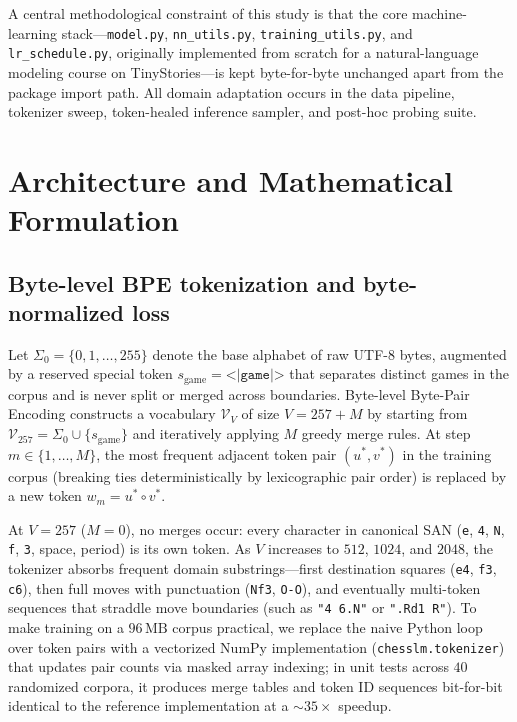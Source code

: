 \documentclass[11pt]{article}
\begin{document}
A central methodological constraint of this study is that the core machine-learning stack---\texttt{model.py}, \texttt{nn\_utils.py}, \texttt{training\_utils.py}, and \texttt{lr\_schedule.py}, originally implemented from scratch for a natural-language modeling course on TinyStories---is kept byte-for-byte unchanged apart from the package import path. All domain adaptation occurs in the data pipeline, tokenizer sweep, token-healed inference sampler, and post-hoc probing suite.

\section{Architecture and Mathematical Formulation}
\label{sec:architecture}

\subsection{Byte-level BPE tokenization and byte-normalized loss}
\label{sec:bpe}

Let $\Sigma_0 = \{0, 1, \dots, 255\}$ denote the base alphabet of raw UTF-8 bytes, augmented by a reserved special token $s_{\mathrm{game}} = \texttt{<|game|>}$ that separates distinct games in the corpus and is never split or merged across boundaries. Byte-level Byte-Pair Encoding \citep{sennrich2016,radford2019} constructs a vocabulary $\mathcal{V}_V$ of size $V = 257 + M$ by starting from $\mathcal{V}_{257} = \Sigma_0 \cup \{s_{\mathrm{game}}\}$ and iteratively applying $M$ greedy merge rules. At step $m \in \{1, \dots, M\}$, the most frequent adjacent token pair $(u^\ast, v^\ast)$ in the training corpus (breaking ties deterministically by lexicographic pair order) is replaced by a new token $w_m = u^\ast \circ v^\ast$.

At $V=257$ ($M=0$), no merges occur: every character in canonical SAN (\texttt{e}, \texttt{4}, \texttt{N}, \texttt{f}, \texttt{3}, space, period) is its own token. As $V$ increases to $512$, $1024$, and $2048$, the tokenizer absorbs frequent domain substrings---first destination squares (\texttt{e4}, \texttt{f3}, \texttt{c6}), then full moves with punctuation (\texttt{Nf3}, \texttt{O-O}), and eventually multi-token sequences that straddle move boundaries (such as \texttt{"4 6.N"} or \texttt{".Rd1 R"}). To make training on a $96\,\mathrm{MB}$ corpus practical, we replace the naive Python loop over token pairs with a vectorized NumPy implementation (\texttt{chesslm.tokenizer}) that updates pair counts via masked array indexing; in unit tests across $40$ randomized corpora, it produces merge tables and token ID sequences bit-for-bit identical to the reference implementation at a ${\sim}35\times$ speedup.
\end{document}
